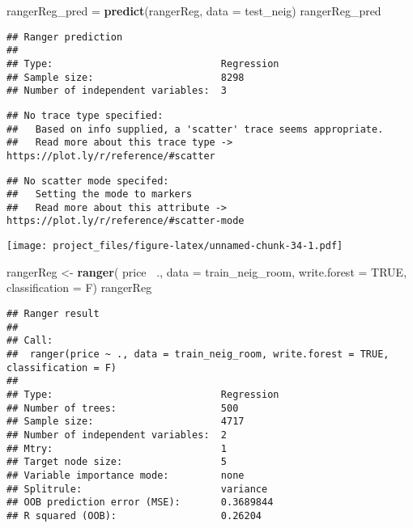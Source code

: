 \documentclass[
]{article}
\newenvironment{Shaded}{\begin{snugshade}}{\end{snugshade}}
\newcommand{\DataTypeTok}[1]{\textcolor[rgb]{0.13,0.29,0.53}{#1}}
\newcommand{\KeywordTok}[1]{\textcolor[rgb]{0.13,0.29,0.53}{\textbf{#1}}}
\newcommand{\NormalTok}[1]{#1}
\newcommand{\OperatorTok}[1]{\textcolor[rgb]{0.81,0.36,0.00}{\textbf{#1}}}
\newcommand{\OtherTok}[1]{\textcolor[rgb]{0.56,0.35,0.01}{#1}}
\newcommand{\StringTok}[1]{\textcolor[rgb]{0.31,0.60,0.02}{#1}}
\begin{document}
\begin{Shaded}
\begin{Highlighting}[]
\NormalTok{rangerReg_pred =}\StringTok{ }\KeywordTok{predict}\NormalTok{(rangerReg, }\DataTypeTok{data =}\NormalTok{ test_neig)}
\NormalTok{rangerReg_pred}
\end{Highlighting}
\end{Shaded}

\begin{verbatim}
## Ranger prediction
## 
## Type:                             Regression 
## Sample size:                      8298 
## Number of independent variables:  3
\end{verbatim}

\begin{Shaded}
\end{Shaded}

\begin{verbatim}
## No trace type specified:
##   Based on info supplied, a 'scatter' trace seems appropriate.
##   Read more about this trace type -> https://plot.ly/r/reference/#scatter
\end{verbatim}

\begin{verbatim}
## No scatter mode specifed:
##   Setting the mode to markers
##   Read more about this attribute -> https://plot.ly/r/reference/#scatter-mode
\end{verbatim}

\texttt{[image: project\_files/figure-latex/unnamed-chunk-34-1.pdf]}

\begin{Shaded}
\begin{Highlighting}[]
\NormalTok{rangerReg <-}\StringTok{ }\KeywordTok{ranger}\NormalTok{( price}\OperatorTok{~}\StringTok{ }\NormalTok{., }\DataTypeTok{data =}\NormalTok{ train_neig_room, }\DataTypeTok{write.forest =} \OtherTok{TRUE}\NormalTok{, }\DataTypeTok{classification =}\NormalTok{ F)}
\NormalTok{rangerReg}
\end{Highlighting}
\end{Shaded}

\begin{verbatim}
## Ranger result
## 
## Call:
##  ranger(price ~ ., data = train_neig_room, write.forest = TRUE,      classification = F) 
## 
## Type:                             Regression 
## Number of trees:                  500 
## Sample size:                      4717 
## Number of independent variables:  2 
## Mtry:                             1 
## Target node size:                 5 
## Variable importance mode:         none 
## Splitrule:                        variance 
## OOB prediction error (MSE):       0.3689844 
## R squared (OOB):                  0.26204
\end{verbatim}
\end{document}
